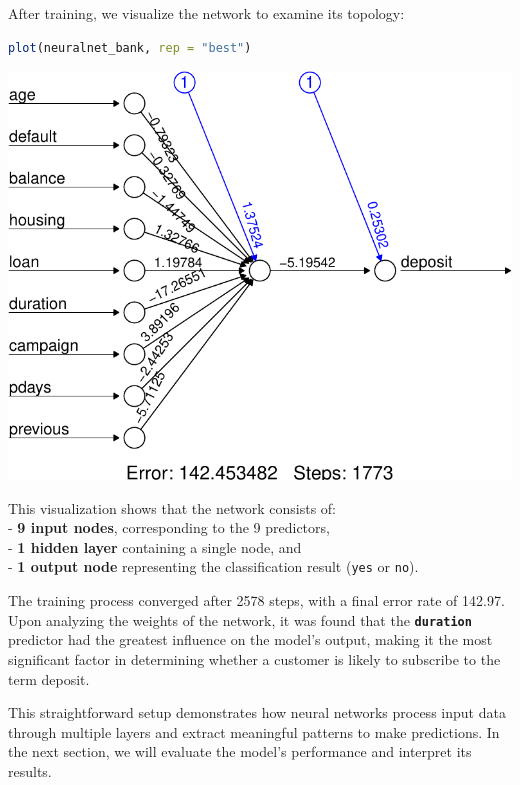 \documentclass[
]{book}
\newcommand{\passthrough}[1]{#1}
\theoremstyle{definition}
\theoremstyle{definition}
\theoremstyle{definition}
\theoremstyle{definition}
\theoremstyle{remark}
\begin{document}
After training, we visualize the network to examine its topology:

\begin{lstlisting}[language=R]
plot(neuralnet_bank, rep = "best")
\end{lstlisting}

\begin{center}\includegraphics{nn_files/figure-latex/unnamed-chunk-11-1} \end{center}

This visualization shows that the network consists of:\\
- \textbf{9 input nodes}, corresponding to the 9 predictors,\\
- \textbf{1 hidden layer} containing a single node, and\\
- \textbf{1 output node} representing the classification result (\passthrough{\lstinline!yes!} or \passthrough{\lstinline!no!}).

The training process converged after 2578 steps, with a final error rate of 142.97. Upon analyzing the weights of the network, it was found that the \textbf{\passthrough{\lstinline!duration!}} predictor had the greatest influence on the model's output, making it the most significant factor in determining whether a customer is likely to subscribe to the term deposit.

This straightforward setup demonstrates how neural networks process input data through multiple layers and extract meaningful patterns to make predictions. In the next section, we will evaluate the model's performance and interpret its results.
\end{document}
